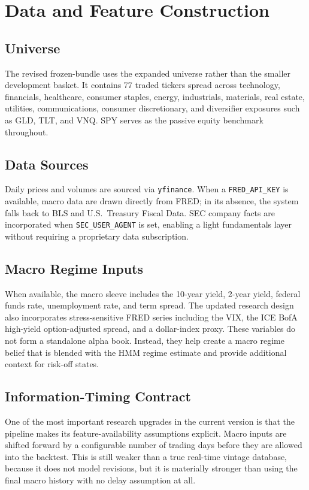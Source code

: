 \documentclass[11pt]{article}
\begin{document}
\section{Data and Feature Construction}

\subsection{Universe}

The revised frozen-bundle uses the expanded universe rather than the smaller
development basket. It contains 77 traded tickers spread across technology,
financials, healthcare, consumer staples, energy, industrials, materials, real
estate, utilities, communications, consumer discretionary, and diversifier
exposures such as GLD, TLT, and VNQ. SPY serves as the passive equity benchmark
throughout.

\subsection{Data Sources}

Daily prices and volumes are sourced via \texttt{yfinance}. When a
\texttt{FRED\_API\_KEY} is available, macro data are drawn directly from FRED;
in its absence, the system falls back to BLS and U.S.\ Treasury Fiscal Data.
SEC company facts are incorporated when \texttt{SEC\_USER\_AGENT} is set,
enabling a light fundamentals layer without requiring a proprietary data
subscription.

\subsection{Macro Regime Inputs}

When available, the macro sleeve includes the 10-year yield, 2-year yield,
federal funds rate, unemployment rate, and term spread. The updated research
design also incorporates stress-sensitive FRED series including the VIX, the
ICE BofA high-yield option-adjusted spread, and a dollar-index proxy. These
variables do not form a standalone alpha book. Instead, they help create a
macro regime belief that is blended with the HMM regime estimate and provide
additional context for risk-off states.

\subsection{Information-Timing Contract}

One of the most important research upgrades in the current version is that the
pipeline makes its feature-availability assumptions explicit. Macro inputs are
shifted forward by a configurable number of trading days before they are allowed
into the backtest. This is still weaker than a true real-time vintage database,
because it does not model revisions, but it is materially stronger than using
the final macro history with no delay assumption at all.
\end{document}
